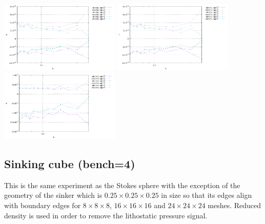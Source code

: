 \begin{center}
\includegraphics[width=5.7cm]{python_codes/fieldstone_82/RESULTS/bench3/u.pdf}
\includegraphics[width=5.7cm]{python_codes/fieldstone_82/RESULTS/bench3/v.pdf}
\includegraphics[width=5.7cm]{python_codes/fieldstone_82/RESULTS/bench3/w.pdf}\\
\end{center}







\newpage
\subsection*{Sinking cube (bench=4)}

This is the same experiment as the Stokes sphere with the exception of the geometry of the sinker which 
is $0.25\times 0.25 \times 0.25$ in size so that its edges align with boundary edges 
for $8 \times 8 \times 8$, $16 \times 16 \times 16$ and $24 \times 24 \times 24$ meshes.
Reduced density is used in order to remove the lithostatic pressure signal.
 
